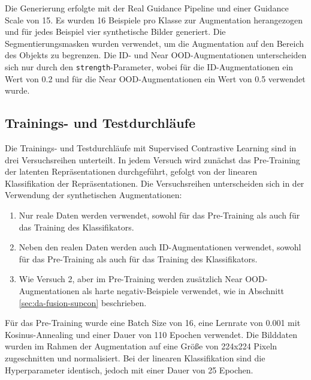Die Generierung erfolgte mit der Real Guidance Pipeline und einer Guidance Scale von 15. Es wurden 16 Beispiele pro Klasse zur Augmentation herangezogen und für jedes Beispiel vier synthetische Bilder generiert. Die Segmentierungsmasken wurden verwendet, um die Augmentation auf den Bereich des Objekts zu begrenzen. Die ID- und Near OOD-Augmentationen unterscheiden sich nur durch den \lstinline{strength}-Parameter, wobei für die ID-Augmentationen ein Wert von 0.2 und für die Near OOD-Augmentationen ein Wert von 0.5 verwendet wurde.

\subsection{Trainings- und Testdurchläufe} \label{sec:supcon-setup}

Die Trainings- und Testdurchläufe mit Supervised Contrastive Learning sind in drei Versuchsreihen unterteilt. In jedem Versuch wird zunächst das Pre-Training der latenten Repräsentationen durchgeführt, gefolgt von der linearen Klassifikation der Repräsentationen. Die Versuchsreihen unterscheiden sich in der Verwendung der synthetischen Augmentationen:

\begin{enumerate} %
	\item Nur reale Daten werden verwendet, sowohl für das Pre-Training als auch für das Training des Klassifikators.
	\item Neben den realen Daten werden auch ID-Augmentationen verwendet, sowohl für das Pre-Training als auch für das Training des Klassifikators.
	\item Wie Versuch 2, aber im Pre-Training werden zusätzlich Near OOD-Augmentationen als harte negativ-Beispiele verwendet, wie in Abschnitt \ref{sec:da-fusion-supcon} beschrieben.
\end{enumerate}

Für das Pre-Training wurde eine Batch Size von 16, eine Lernrate von 0.001 mit Kosinus-Annealing und einer Dauer von 110 Epochen verwendet. Die Bilddaten wurden im Rahmen der Augmentation auf eine Größe von 224x224 Pixeln zugeschnitten und normalisiert. Bei der linearen Klassifikation sind die Hyperparameter identisch, jedoch mit einer Dauer von 25 Epochen.

